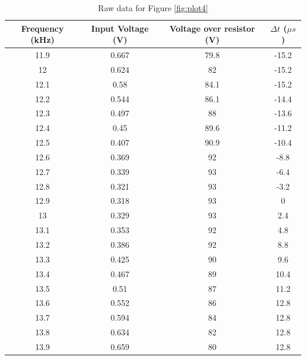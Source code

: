 \documentclass{article}
\begin{document}
\begin{table}[H]
    \centering
    \begin{tabular}{c|c|c|c}
        Frequency (kHz) & Input Voltage (V) & Voltage over resistor (V) &
        $\Delta t$ ($\mu s$) \\
        \hline
        11.9	&	0.667	&	79.8	&	-15.2	\\
        12	&	0.624	&	82	&	-15.2	\\
        12.1	&	0.58	&	84.1	&	-15.2	\\
        12.2	&	0.544	&	86.1	&	-14.4	\\
        12.3	&	0.497	&	88	&	-13.6	\\
        12.4	&	0.45	&	89.6	&	-11.2	\\
        12.5	&	0.407	&	90.9	&	-10.4	\\
        12.6	&	0.369	&	92	&	-8.8	\\
        12.7	&	0.339	&	93	&	-6.4	\\
        12.8	&	0.321	&	93	&	-3.2	\\
        12.9	&	0.318	&	93	&	0	\\
        13	&	0.329	&	93	&	2.4	\\
        13.1	&	0.353	&	92	&	4.8	\\
        13.2	&	0.386	&	92	&	8.8	\\
        13.3	&	0.425	&	90	&	9.6	\\
        13.4	&	0.467	&	89	&	10.4	\\
        13.5	&	0.51	&	87	&	11.2	\\
        13.6	&	0.552	&	86	&	12.8	\\
        13.7	&	0.594	&	84	&	12.8	\\
        13.8	&	0.634	&	82	&	12.8	\\
        13.9	&	0.659	&	80	&	12.8	    
    \end{tabular}
    \caption{Raw data for Figure \ref{fig:plot4}}
    \label{fig:t4}
\end{table}
\end{document}
